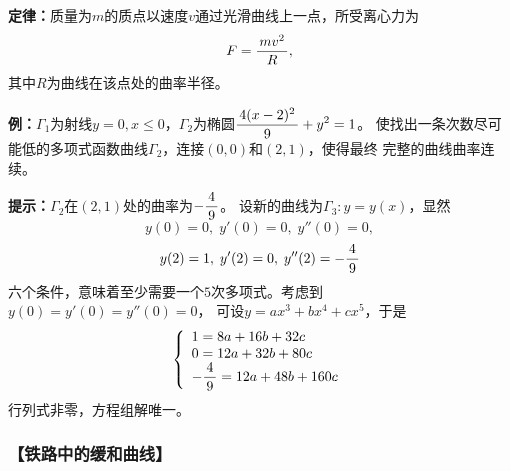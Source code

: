 {\bf 定律：}质量为$m$的质点以速度$v$通过光滑曲线上一点，所受离心力为
$$F=\displaystyle\frac{\,{mv^2}\,}{\,{R}\,},$$
其中$R$为曲线在该点处的曲率半径。

\begin{center}
\end{center}

{\bf 例：}$\Gamma_1$为射线$y=0,x\leq0$，$\Gamma_2$为椭圆$\displaystyle\frac{\,{4(x-2)^2}\,}{\,{9}\,}+y^2=1$。
使找出一条次数尽可能低的多项式函数曲线$\Gamma_2$，连接$(0,0)$和$(2,1)$，使得最终
完整的曲线曲率连续。

{\bf 提示：}$\Gamma_2$在$(2,1)$处的曲率为$-\displaystyle\frac{\,{4}\,}{\,{9}\,}$。
设新的曲线为$\Gamma_3:y=y(x)$，显然
$$y(0)=0,\;y'(0)=0,\;y''(0)=0,$$
$$y(2)=1,\;y'(2)=0,\;y''(2)=-\displaystyle\frac{\,{4}\,}{\,{9}\,}$$
六个条件，意味着至少需要一个$5$次多项式。考虑到$y(0)=y'(0)=y''(0)=0$，
可设$y=ax^3+bx^4+cx^5$，于是
$$
\left\{
\begin{array}{l}
1=8a+16b+32c\\
0=12a+32b+80c\\
-\displaystyle\frac{\,{4}\,}{\,{9}\,}=12a+48b+160c
\end{array}
\right.
$$
行列式非零，方程组解唯一。

\subsubsection{【铁路中的缓和曲线】}

